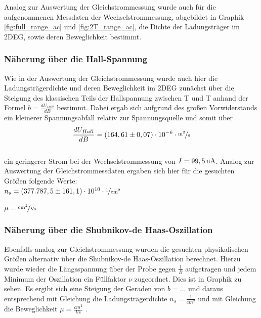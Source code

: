 

Analog zur Auswertung der Gleichstrommessung wurde auch für die aufgenommenen Messdaten der Wechselstrommessung, abgebildet in Graphik \ref{fig:full_range_ac} und \ref{fig:2T_range_ac}, die Dichte der Ladungsträger im 2DEG, sowie deren Beweglichkeit bestimmt.

\subsubsection{Näherung über die Hall-Spannung}
\label{ch:naeherung_hall2}

Wie in der Auswertung der Gleichstrommessung wurde auch hier die Ladungsträgerdichte und deren Beweglichkeit im 2DEG zunächst über die Steigung des klassischen Teils der Hallspannung zwischen \unit[-2]{T} und \unit[2]{T} anhand der Formel $b=\frac{dU_{Hall}}{dB}$  
bestimmt. Dabei ergab sich aufgrund des großen Vorwiderstands ein kleinerer Spannungsabfall relativ zur Spannungsquelle und somit über 
\\
\begin{equation}
	\d{U_{Hall}}{B} = ( 164,61 \pm 0,07 ) \cdot 10^{-6} \cdot \unitfrac{m^2}{s}
\end{equation}
\\
ein geringerer Strom bei der Wechselstrommessung von $I=\unit[99,5]{nA}$. Analog zur Auswertung der Gleichstrommessdaten ergaben sich hier für die gesuchten Größen folgende Werte: \\

$n_s=  ( 377.787,5 \pm 161,1) \cdot 10^{10} \cdot \unitfrac{1}{cm^2}$  %


$\mu= \unitfrac{cm^2}{Vs}$  %


\subsubsection{Näherung über die Shubnikov-de Haas-Oszillation}
\label{ch:naeherung_ac}

Ebenfalls analog zur Gleichstrommessung wurden die gesuchten physikalischen Größen alternativ über die Shubnikov-de Haas-Oszillation berechnet. Hierzu wurde wieder die Längsspannung über der Probe 
gegen $\frac{1}{B}$ aufgetragen und jedem Minimum der Oszillation ein Füllfaktor $\nu$ zugeordnet. Dies ist in Graphik %
zu sehen. 
Es ergibt sich eine Steigung der Geraden von $b=...$  %
und daraus entsprechend mit Gleichung %
die Ladungsträgerdichte $n_s= \frac{1}{cm^2}$  %
und mit Gleichung %
die Beweglichkeit          
$\mu= \frac{cm^2}{Vs}$ . %




